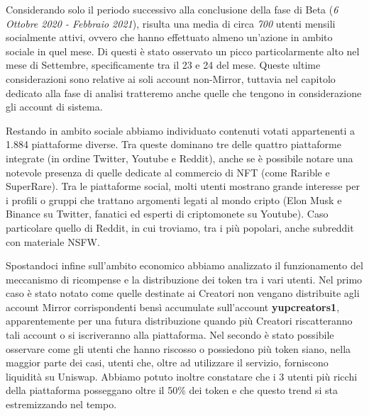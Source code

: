Considerando solo il periodo successivo alla conclusione della fase di Beta (\textit{6 Ottobre 2020 - Febbraio 2021}), risulta una media di circa \textit{700} utenti mensili socialmente attivi, ovvero che hanno effettuato almeno un'azione in ambito sociale in quel mese. Di questi è stato osservato un picco particolarmente alto nel mese di Settembre, specificamente tra il 23 e 24 del mese. Queste ultime considerazioni sono relative ai soli account non-Mirror, tuttavia nel capitolo dedicato alla fase di analisi tratteremo anche quelle che tengono in considerazione gli account di sistema.

Restando in ambito sociale abbiamo individuato contenuti votati appartenenti a 1.884 piattaforme diverse. Tra queste dominano tre delle quattro piattaforme integrate (in ordine Twitter, Youtube e Reddit), anche se è possibile notare una notevole presenza di quelle dedicate al commercio di NFT (come Rarible e SuperRare). Tra le piattaforme social, molti utenti mostrano grande interesse per i profili o gruppi che trattano argomenti legati al mondo cripto (Elon Musk e Binance su Twitter, fanatici ed esperti di criptomonete su Youtube). Caso particolare quello di Reddit, in cui troviamo, tra i più popolari, anche subreddit con materiale NSFW.

Spostandoci infine sull'ambito economico abbiamo analizzato il funzionamento del meccanismo di ricompense e la distribuzione dei token tra i vari utenti. Nel primo caso è stato notato come quelle destinate ai Creatori non vengano distribuite agli account Mirror corrispondenti bensì accumulate sull'account \textbf{yupcreators1}, apparentemente per una futura distribuzione quando più Creatori riscatteranno tali account o si iscriveranno alla piattaforma. Nel secondo è stato possibile osservare come gli utenti che hanno riscosso o possiedono più token siano, nella maggior parte dei casi, utenti che, oltre ad utilizzare il servizio, forniscono liquidità su Uniswap.
Abbiamo potuto inoltre constatare che i 3 utenti più ricchi della piattaforma posseggano oltre il 50\% dei token e che questo trend si sta estremizzando nel tempo.


